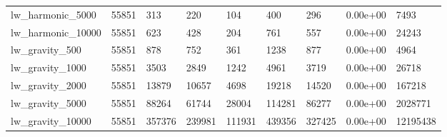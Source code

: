 \begin{tabular}{lrlllllll}
lw\_harmonic\_5000 & 55851 & 313 & 220 & 104 & 400 & 296 & 0.00e+00 & 7493 \\
lw\_harmonic\_10000 & 55851 & 623 & 428 & 204 & 761 & 557 & 0.00e+00 & 24243 \\
lw\_gravity\_500 & 55851 & 878 & 752 & 361 & 1238 & 877 & 0.00e+00 & 4964 \\
lw\_gravity\_1000 & 55851 & 3503 & 2849 & 1242 & 4961 & 3719 & 0.00e+00 & 26718 \\
lw\_gravity\_2000 & 55851 & 13879 & 10657 & 4698 & 19218 & 14520 & 0.00e+00 & 167218 \\
lw\_gravity\_5000 & 55851 & 88264 & 61744 & 28004 & 114281 & 86277 & 0.00e+00 & 2028771 \\
lw\_gravity\_10000 & 55851 & 357376 & 239981 & 111931 & 439356 & 327425 & 0.00e+00 & 12195438 \\
\bottomrule
\end{tabular}
